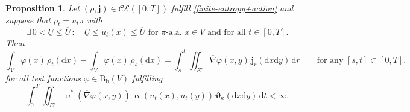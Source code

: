 \documentclass[11pt,reqno]{amsart}
\numberwithin{equation}{section}
\newcommand{\CE}[2]{\calC \calE([#1,#2])}
\newcommand{\calC}{\mathcal{C}}
\newcommand{\calE}{\mathcal{E}}
\newcommand{\dnabla}{\overline\nabla}
\newcommand{\dd}{\mathrm{d}}
\newtheorem{proposition}[theorem]{Proposition}
\theoremstyle{definition}
\def\dd{\mathrm{d}}
\newcommand{\Bb}{\mathrm{B}_{\mathrm b}}
\newcommand{\teta}{\boldsymbol \vartheta}
\newcommand{\tetapi}{\boldsymbol{\teta}_{\kappa}}
\newcommand{\bj}{{\boldsymbol j}}
\newcommand{\jj}{{\boldsymbol{j}}}
\newcommand{\Ed}{{E'}}
\newcommand{\RBS}{\color{black}} %
\newcommand{\TODO}[1]{\todo[inline, color=cyan!20]{#1}}
\newcommand{\EEE}{\color{black}}
\numberwithin{equation}{section}
\begin{document}
\begin{proposition}
\label{prop:ENH-CE} 
 Let $(\rho,\jj)\in\CE 0T$ fulfill \eqref{finite-entropy+action} \RBS  and
 suppose that  $\rho_t = u_t \pi$ with 
 \begin{equation}
 \label{strong-bounds}
\exists\, 0<\underline U \leq \overline U \, : \quad \underline U   \leq u_t(x) \leq \overline U   \text{ for $\pi$-a.a.\ $x \in V$ and for all } t\in [0,T].
\end{equation}
\EEE
 Then
 \begin{equation}
 \label{desired-CE}
    \int_V \varphi(x)\,\rho_t(\dd x) - \int_V \varphi(x)\,\rho_s(\dd x) = \int_s^t \iint_\Ed \dnabla \varphi(x,y)\,\bj_r(\dd x \dd y)\,\dd r\qquad\text{for any $[s,t]\subset[0,T]$}.
 \end{equation}
 for all test functions
 $\varphi \in \Bb(V)$ fulfilling
  \begin{equation}
  \label{eq:test_extend}
    \int_0^T \iint_\Ed \uppsi^*(\dnabla \varphi(x,y))\,\upalpha(u_t(x),u_t(y))\,\tetapi(\dd x \dd y)\,\dd t <\infty.
\end{equation}
\end{proposition}
\end{document}
